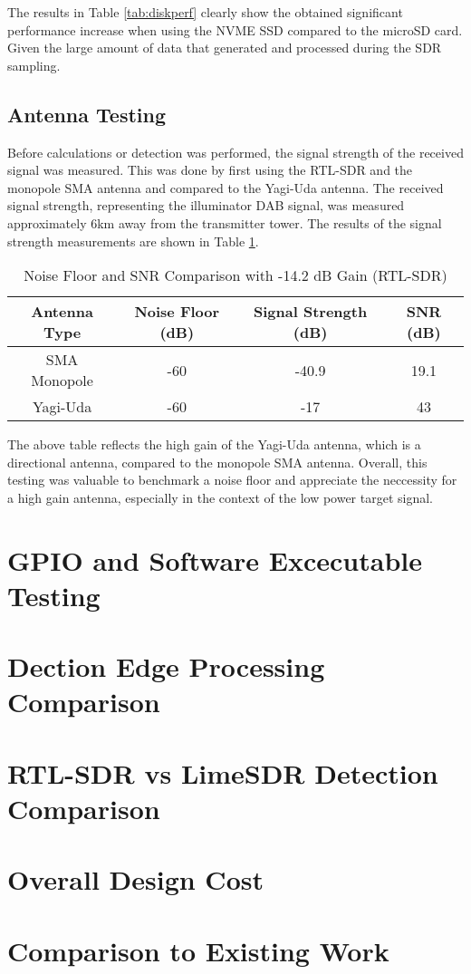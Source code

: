 The results in Table \ref{tab:diskperf} clearly show the obtained significant performance increase when using the NVME SSD compared to the microSD card. Given the large amount of data that generated and processed during the SDR sampling. 

\subsection{Antenna Testing \label{sec:antennaVerification}}


Before calculations or detection was performed, the signal strength of the received signal was measured. This was done by first using the RTL-SDR and the monopole SMA antenna and compared to the Yagi-Uda antenna. The received signal strength, representing the illuminator DAB signal, was measured approximately 6km away from the transmitter tower.  The results of the signal strength measurements are shown in Table \ref{tab:signalstrength}.

\begin{table}[h!]
    \centering
    \caption{Noise Floor and SNR Comparison with -14.2 dB Gain (RTL-SDR)}
    \label{tab:signalstrength}
    \begin{tabular}{|c|c|c|c|}
        \hline
        \textbf{Antenna Type} & \textbf{Noise Floor (dB)} & \textbf{Signal Strength (dB)} & \textbf{SNR (dB)} \\ \hline
        SMA Monopole & -60 & -40.9 & 19.1 \\ \hline
        Yagi-Uda     & -60 & -17   & 43   \\ \hline
    \end{tabular}
    \vspace{0.5cm}
\end{table}

The above table reflects the high gain of the Yagi-Uda antenna, which is a directional antenna, compared to the monopole SMA antenna. Overall, this testing was valuable to benchmark a noise floor and appreciate the neccessity for a high gain antenna, especially in the context of the low power target signal.

\section{GPIO and Software Excecutable Testing \label{sec:gpioTesting}}

\section{Dection Edge Processing Comparison} \label{sec:edgeProcessing}


\section{RTL-SDR vs LimeSDR Detection Comparison \label{sec:SDRcomparison}}

\section{Overall Design Cost}

\section{Comparison to Existing Work}

